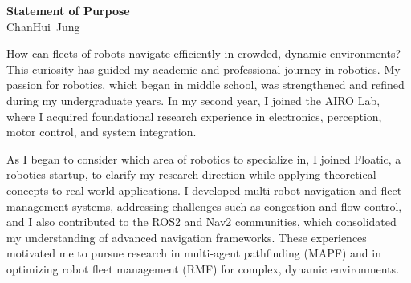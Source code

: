 \documentclass[12pt]{article}
\newcommand\firstName{ChanHui}
\newcommand\lastName{Jung}
\newcommand\fullName{\firstName~\lastName}
\begin{document}
\begin{center}
  {\large\bfseries Statement of Purpose}\\[-0.2em]
  {\normalsize \textcolor{sectiongray}{\fullName}}
\end{center}

How can fleets of robots navigate efficiently in crowded, dynamic environments?
This curiosity has guided my academic and professional journey in robotics.
My passion for robotics, which began in middle school, was strengthened and refined during my undergraduate years.
In my second year, I joined the AIRO Lab, where I acquired foundational research experience in electronics, perception, motor control, and system integration.

As I began to consider which area of robotics to specialize in, I joined Floatic, a robotics startup, to clarify my research direction while applying theoretical concepts to real-world applications.
I developed multi-robot navigation and fleet management systems, addressing challenges such as congestion and flow control, and I also contributed to the ROS2 and Nav2 communities, which consolidated my understanding of advanced navigation frameworks.
These experiences motivated me to pursue research in multi-agent pathfinding (MAPF) and in optimizing robot fleet management (RMF) for complex, dynamic environments.

\vspace{0.8em}
\end{document}
